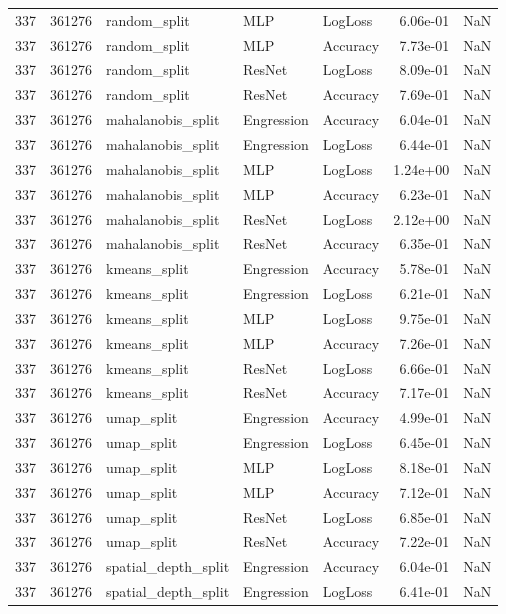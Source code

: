 \begin{tabular}{rrlllrr}
337 & 361276 & random\_split & MLP & LogLoss & 6.06e-01 & NaN \\
337 & 361276 & random\_split & MLP & Accuracy & 7.73e-01 & NaN \\
337 & 361276 & random\_split & ResNet & LogLoss & 8.09e-01 & NaN \\
337 & 361276 & random\_split & ResNet & Accuracy & 7.69e-01 & NaN \\
337 & 361276 & mahalanobis\_split & Engression & Accuracy & 6.04e-01 & NaN \\
337 & 361276 & mahalanobis\_split & Engression & LogLoss & 6.44e-01 & NaN \\
337 & 361276 & mahalanobis\_split & MLP & LogLoss & 1.24e+00 & NaN \\
337 & 361276 & mahalanobis\_split & MLP & Accuracy & 6.23e-01 & NaN \\
337 & 361276 & mahalanobis\_split & ResNet & LogLoss & 2.12e+00 & NaN \\
337 & 361276 & mahalanobis\_split & ResNet & Accuracy & 6.35e-01 & NaN \\
337 & 361276 & kmeans\_split & Engression & Accuracy & 5.78e-01 & NaN \\
337 & 361276 & kmeans\_split & Engression & LogLoss & 6.21e-01 & NaN \\
337 & 361276 & kmeans\_split & MLP & LogLoss & 9.75e-01 & NaN \\
337 & 361276 & kmeans\_split & MLP & Accuracy & 7.26e-01 & NaN \\
337 & 361276 & kmeans\_split & ResNet & LogLoss & 6.66e-01 & NaN \\
337 & 361276 & kmeans\_split & ResNet & Accuracy & 7.17e-01 & NaN \\
337 & 361276 & umap\_split & Engression & Accuracy & 4.99e-01 & NaN \\
337 & 361276 & umap\_split & Engression & LogLoss & 6.45e-01 & NaN \\
337 & 361276 & umap\_split & MLP & LogLoss & 8.18e-01 & NaN \\
337 & 361276 & umap\_split & MLP & Accuracy & 7.12e-01 & NaN \\
337 & 361276 & umap\_split & ResNet & LogLoss & 6.85e-01 & NaN \\
337 & 361276 & umap\_split & ResNet & Accuracy & 7.22e-01 & NaN \\
337 & 361276 & spatial\_depth\_split & Engression & Accuracy & 6.04e-01 & NaN \\
337 & 361276 & spatial\_depth\_split & Engression & LogLoss & 6.41e-01 & NaN \\

\end{tabular}

